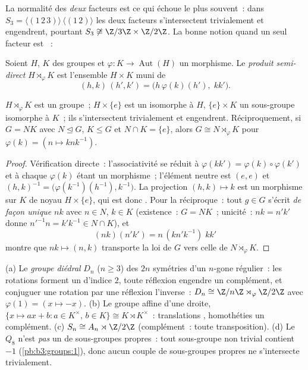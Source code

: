 La normalité des \emph{deux} facteurs est ce qui échoue le plus
souvent~: dans $S_3 = \langle (1\,2\,3)\rangle \,\langle(1\,2)
\rangle$ les deux facteurs s'intersectent trivialement et
engendrent, pourtant $S_3 \not\cong \Z/3\Z \times \Z/2\Z$. La
bonne notion quand un seul facteur est ~:

\begin{definition}\label{def:b3:groups:semidirect}
Soient $H$, $K$ des groupes et $\varphi \colon K \to
\operatorname{Aut}(H)$ un morphisme. Le \emph{produit
semi-direct} $H \rtimes_\varphi K$ est
l'ensemble $H \times K$ muni de
\[
(h, k)\,(h', k') = \bigl(h\,\varphi(k)(h'),\; kk'\bigr).
\]
\end{definition}

\begin{proposition}\label{prop:b3:groups:semidirect}
$H \rtimes_\varphi K$ est un groupe~; $H \times \{e\}$ est un
 isomorphe à $H$, $\{e\} \times K$ un
sous-groupe isomorphe à $K$~; ils s'intersectent trivialement et
engendrent. Réciproquement, si $G = NK$ avec $N \trianglelefteq
G$, $K \leq G$ et $N \cap K = \{e\}$, alors $G \cong N
\rtimes_\varphi K$ pour $\varphi(k) = (n \mapsto knk^{-1})$.
\end{proposition}

\begin{proof}
Vérification directe~: l'associativité se réduit à $\varphi(kk')
= \varphi(k)\circ\varphi(k')$ et à chaque $\varphi(k)$ étant un
morphisme~; l'élément neutre est $(e,e)$ et $(h,k)^{-1} =
\bigl(\varphi(k^{-1})(h^{-1}), k^{-1}\bigr)$. La projection
$(h,k) \mapsto k$ est un morphisme sur $K$ de noyau $H \times
\{e\}$, qui est donc . Pour la réciproque~: tout $g \in G$
s'écrit \emph{de façon unique} $nk$ avec $n \in N$, $k \in K$
(existence~: $G = NK$~; unicité~: $nk = n'k'$ donne $n'^{-1}n =
k'k^{-1} \in N \cap K$), et
\[
(nk)(n'k') = n\,(kn'k^{-1})\;kk'
\]
montre que $nk \mapsto (n, k)$ transporte la loi de $G$ vers
celle de $N \rtimes_\varphi K$.
\end{proof}

\begin{example}\label{ex:b3:groups:semidirectexamples}
(a) Le \emph{groupe diédral} $D_n$ ($n \geq
3$) des $2n$ symétries d'un $n$-gone régulier~: les rotations
forment un  d'indice $2$, toute réflexion
engendre un complément, et conjuguer une rotation par une
réflexion l'inverse~: $D_n \cong \Z/n\Z \rtimes_\varphi \Z/2\Z$
avec $\varphi(1) = (x \mapsto -x)$.
(b) Le groupe affine d'une droite, $\{x \mapsto ax + b : a \in
K^\times,\, b \in K\} \cong K \rtimes K^\times$~: translations
, homothéties un complément.
(c) $S_n \cong A_n \rtimes \Z/2\Z$ (complément~: toute
transposition).
(d) Le  $Q_8$ n'est \emph{pas} un  de sous-groupes propres~: tout sous-groupe non
trivial contient $-1$ (\cref{pb:b3:groups:1}), donc aucun couple
de sous-groupes propres ne s'intersecte trivialement.
\end{example}

